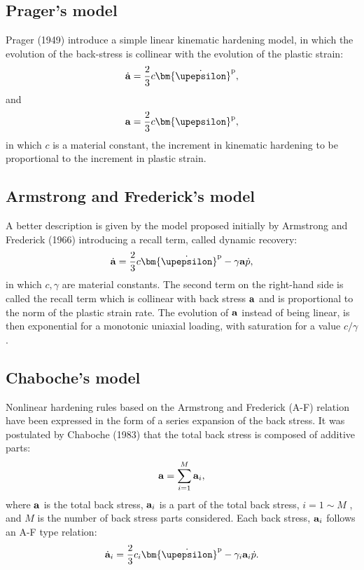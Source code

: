 \subsection{Prager's model}
\noindent
Prager (1949) \cite{prager1949recent} introduce a simple linear kinematic hardening model, in which the evolution of the back-stress is collinear with the evolution of the plastic strain:
\begin{equation}
{\dot{\bf a}} = \frac{2}{3}c{\bm{\dot \upepsilon }}^{\rm{p}},
\end{equation}
and
\begin{equation}
{\bf{ a}} = \frac{2}{3}c{\bm{ \upepsilon }}^{\rm{p}},
\end{equation}
in which $c$ is a material constant, the increment in kinematic hardening to be proportional to the increment
in plastic strain.

\subsection{Armstrong and Frederick's model}
\noindent
A better description is given by the model proposed initially by Armstrong and Frederick (1966) \cite{armstrong1966mathematical} introducing a recall term, called dynamic recovery:
\begin{equation}
{\dot {\bf a}} = \frac{2}{3}c{\bm{\dot \upepsilon }}^{\rm{p}} - \gamma {\bf{a}}\dot p,
\end{equation}
in which $c,\gamma$ are material constants.
The second term on the right-hand side is called the recall term which is collinear with back stress $\bf{a}$ and is proportional to the norm of the plastic strain rate. The evolution of $\bf{a}$ instead of being linear, is then exponential for a monotonic uniaxial loading, with saturation for a value $c/\gamma $.

\subsection{Chaboche's model}
\noindent
Nonlinear hardening rules based on the Armstrong and Frederick (A-F) relation have been expressed in the form of a series expansion of the back stress.
It was postulated by Chaboche (1983) \cite{chaboche1983plastic} that the total back stress is composed of additive parts:
\begin{equation}
{\bf{a}} = \sum\limits_{i = 1}^M {{{\bf{a}}_i}},
\end{equation}
where ${\bf{a}}$ is the total back stress, ${{{\bf{a}}_i}}$ is a part of the total back stress, $i = 1\sim M$ , and $M$ is the number of back stress parts considered. Each back stress, ${{{\bf{a}}_i}}$ follows an A-F type relation:
\begin{equation}
{{\dot{\bf a}}_i} = \frac{2}{3}{c_i}{{\bm{\dot \upepsilon }}^{\rm{p}}} - {\gamma _i}{{\bf{a}}_i}\dot p.
\end{equation}

